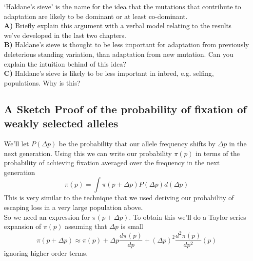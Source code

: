 \begin{question}
`Haldane's sieve' is the name for the idea that the mutations that contribute to adaptation are likely to be dominant or at least co-dominant. \\
{\bf A)} Briefly explain this argument with a verbal model relating to the
results we’ve developed in the last two chapters. \\
{\bf B)} Haldane’s sieve is thought to be less important for adaptation from previously deleterious standing variation, than adaptation from new mutation. Can you explain the intuition behind of this idea?\\
{\bf C)} Haldane’s sieve is likely to be less important in inbred,
e.g. selfing, populations. Why is this? \\

\end{question}




\subsection{A Sketch Proof of the probability of fixation of
weakly selected alleles} \label{Section:fixation_weakly_sel}

We'll let $P(\Delta p)$ be the probability that our allele frequency
shifts by $\Delta p$ in the next generation. Using this we can write our probability $\pi(p)$ in terms of the probability of
achieving fixation averaged over the frequency in the next generation
\begin{equation}
\pi(p)  = \int \pi(p+\Delta p) P(\Delta p) d(\Delta p) \label{eqn:prob_fix_diff_step1}
\end{equation}
This is very similar to the technique that we used deriving our
probability of escaping loss in a very large population above. \\

So we need an expression for $\pi(p+\Delta p)$. To obtain this we'll
do a Taylor series expansion of $\pi(p)$ assuming that $\Delta p $ is small
\begin{equation}
\pi(p+\Delta p) \approx \pi(p) + \Delta p \frac{d\pi(p)}{dp} + (\Delta p)^2
\frac{d^2\pi(p)}{dp^2} (p)
\end{equation}
ignoring higher order terms.\\

